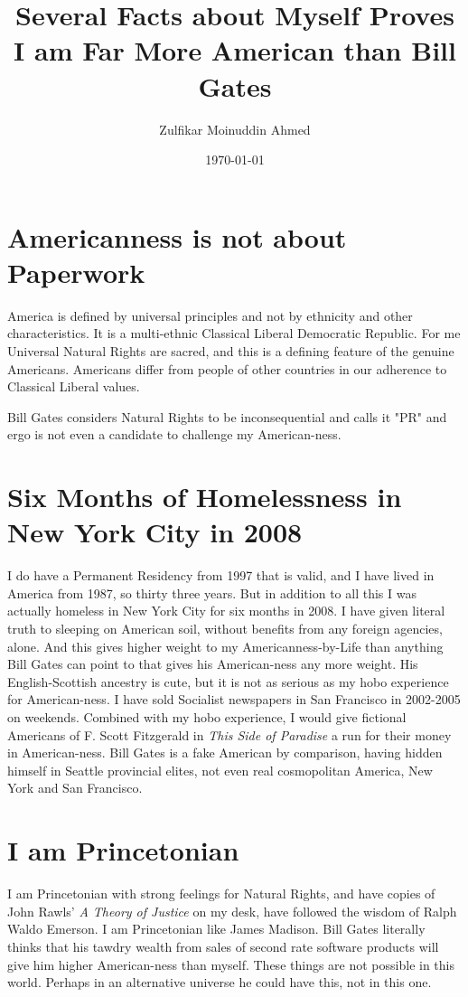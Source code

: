 \documentclass{amsart}
\title{Several Facts about Myself Proves I am Far More American than Bill Gates}
\author{Zulfikar Moinuddin Ahmed}
\date{\today}
\begin{document}
\maketitle

\section{Americanness is not about Paperwork}

America is defined by universal principles and not by ethnicity and other characteristics.  It is a multi-ethnic Classical Liberal Democratic Republic.  For me Universal Natural Rights are sacred, and this is a defining feature of the genuine Americans.  Americans differ from people of other countries in our adherence to Classical Liberal values.

Bill Gates considers Natural Rights to be inconsequential and calls it "PR" and ergo is not even a candidate to challenge my American-ness.

\section{Six Months of Homelessness in New York City in 2008}
I do have a Permanent Residency from 1997 that is valid, and I have lived in America from 1987, so thirty three years.  But in addition to all this I was actually homeless in New York City for six months in 2008.  I have given literal truth to sleeping on American soil, without benefits from any foreign agencies, alone.  And this gives higher weight to my Americanness-by-Life than anything Bill Gates can point to that gives his American-ness any more weight.  His English-Scottish ancestry is cute, but it is not as serious as my hobo experience for American-ness.  I have sold Socialist newspapers in San Francisco in 2002-2005 on weekends.  Combined with my hobo experience, I would give fictional Americans of F. Scott Fitzgerald in {\em This Side of Paradise} a run for their money in American-ness.  Bill Gates is a fake American by comparison, having hidden himself in Seattle provincial elites, not even real cosmopolitan America, New York and San Francisco.

\section{I am Princetonian}
I am Princetonian with strong feelings for Natural Rights, and have copies of John Rawls' {\em A Theory of Justice} on my desk, have followed the wisdom of Ralph Waldo Emerson.  I am Princetonian like James Madison.  Bill Gates literally thinks that his tawdry wealth from sales of second rate software products will give him higher American-ness than myself.  These things are not possible in this world.  Perhaps in an alternative universe he could have this, not in this one.
\end{document}
